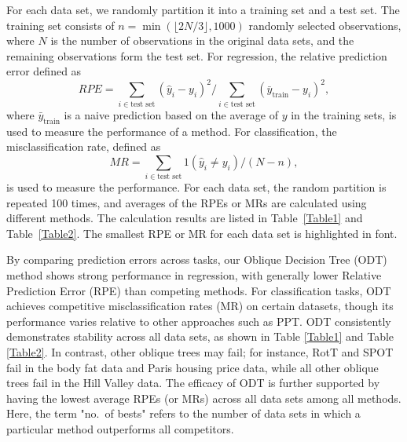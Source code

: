 For each data set, we randomly partition it into a training set and a test set. The training set consists of $n=\min(\lfloor 2N/3\rfloor ,1000)$ randomly selected observations, where $N$ is the number of observations in the original data sets, and the remaining observations form the test set. For regression, the relative prediction error defined as
$$RPE=\sum_{i\in \text{test set}}(\hat{y}_i-y_i)^2/\sum_{i\in \text{test set}}(\bar{y}_{\text{train}}-y_i)^2,$$
where $\bar{y}_{\text{train}}$ is a naive prediction based on the average of $y$ in the training sets, is used to measure the performance of a method. For classification, the misclassification rate, defined as
$$MR=\sum_{i\in \text{test set}} 1(\hat{y}_i \neq y_i) /(N-n),$$
is used to measure the performance. For each data set, the random partition is repeated 100 times,  and averages of the RPEs or MRs are calculated using different methods. The calculation results are listed in Table~\ref{Table1} and Table~\ref{Table2}. The smallest RPE or MR for each data set is highlighted in  font.

{By comparing prediction errors across tasks, our Oblique Decision Tree (ODT) method shows strong performance in regression, with generally lower Relative Prediction Error (RPE) than competing methods. For classification tasks, ODT achieves competitive misclassification rates (MR) on certain datasets, though its performance varies relative to other approaches such as PPT.}
ODT consistently demonstrates stability across all data sets, as shown in Table \ref{Table1} and Table \ref{Table2}. In contrast, other oblique trees may fail; for instance, RotT and SPOT fail in the body fat data and Paris housing price data, while all other oblique trees fail in the Hill Valley data. The efficacy of ODT is further supported by having the lowest average RPEs (or MRs) across all data sets among all methods. Here, the term "no.~of bests" refers to the number of data sets in which a particular method outperforms all competitors.

